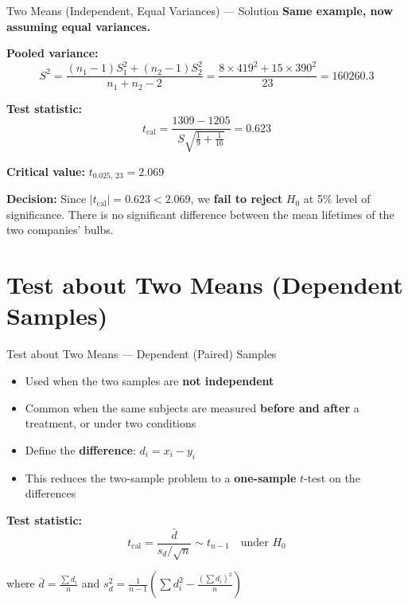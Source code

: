 \documentclass[12pt, aspectratio=169]{beamer}
\begin{document}
    \begin{frame}{Two Means (Independent, Equal Variances) --- Solution}
        \textbf{Same example, now assuming equal variances.}

        \vspace{0.5em}

        \textbf{Pooled variance:}
        \[
            S^2 = \frac{(n_1-1)S_1^2+(n_2-1)S_2^2}{n_1+n_2-2}
            = \frac{8\times 419^2 + 15\times 390^2}{23} = 160260.3
        \]

        \textbf{Test statistic:}
        \[
            t_{\text{cal}} = \frac{1309 - 1205}{S\sqrt{\tfrac{1}{9}+\tfrac{1}{16}}}
            = 0.623
        \]

        \textbf{Critical value:} $t_{0.025,\,23} = 2.069$

        \vspace{0.5em}

        \textbf{Decision:} Since $|t_{\text{cal}}| = 0.623 < 2.069$,
        we \textbf{fail to reject} $H_0$ at 5\% level of significance.
        There is no significant difference between the mean lifetimes of the two companies' bulbs.
    \end{frame}


    \section{Test about Two Means (Dependent Samples)}


    \begin{frame}{Test about Two Means --- Dependent (Paired) Samples}
        \begin{itemize}
            \item Used when the two samples are \textbf{not independent}
            \item Common when the same subjects are measured \textbf{before and after}
                a treatment, or under two conditions
            \item Define the \textbf{difference}: $d_i = x_i - y_i$
            \item This reduces the two-sample problem to a \textbf{one-sample}
                $t$-test on the differences
        \end{itemize}

        \vspace{0.5em}

        \textbf{Test statistic:}
        \[
            t_{\text{cal}} = \frac{\bar{d}}{s_d/\sqrt{n}} \sim t_{n-1}
            \quad \text{under } H_0
        \]

        where $\bar{d} = \frac{\sum d_i}{n}$ and
        $s_d^2 = \frac{1}{n-1}\left(\sum d_i^2 - \frac{(\sum d_i)^2}{n}\right)$
    \end{frame}
\end{document}
